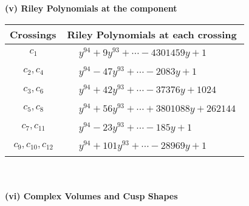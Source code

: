 \documentclass[1p]{elsarticle_modified}
\theoremstyle{definition}
\begin{document}
\newpage\renewcommand{\arraystretch}{1}
\flushleft \textbf{(v) Riley Polynomials at the component}\newline \\
\begin{tabular}{m{50pt}|m{274pt}}
Crossings & \hspace{64pt}Riley Polynomials at each crossing \\
\hline $$\begin{aligned}c_{1}\end{aligned}$$&$\begin{aligned}
&y^{94}+9 y^{93}+\cdots-4301459 y+1
\end{aligned}$\\
\hline $$\begin{aligned}c_{2},c_{4}\end{aligned}$$&$\begin{aligned}
&y^{94}-47 y^{93}+\cdots-2083 y+1
\end{aligned}$\\
\hline $$\begin{aligned}c_{3},c_{6}\end{aligned}$$&$\begin{aligned}
&y^{94}+42 y^{93}+\cdots-37376 y+1024
\end{aligned}$\\
\hline $$\begin{aligned}c_{5},c_{8}\end{aligned}$$&$\begin{aligned}
&y^{94}+56 y^{93}+\cdots+3801088 y+262144
\end{aligned}$\\
\hline $$\begin{aligned}c_{7},c_{11}\end{aligned}$$&$\begin{aligned}
&y^{94}-23 y^{93}+\cdots-185 y+1
\end{aligned}$\\
\hline $$\begin{aligned}c_{9},c_{10},c_{12}\end{aligned}$$&$\begin{aligned}
&y^{94}+101 y^{93}+\cdots-28969 y+1
\end{aligned}$\\
\hline
\end{tabular}\\~\\
\newpage\flushleft \textbf{(vi) Complex Volumes and Cusp Shapes}
\end{document}
